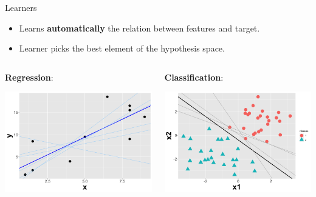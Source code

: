 \documentclass[11pt,compress,t,notes=noshow, xcolor=table]{beamer}
\begin{document}
\begin{vbframe}{Learners}

\begin{itemize}

\item Learns \textbf{automatically} the relation between features and target.
\item Learner picks the best element of the hypothesis space.
\end{itemize} \hspace{0.4cm}

\begin{columns}    
\begin{column}{0.4\textwidth} 
\textbf{Regression}: 

  \begin{center}
    \includegraphics[width=\textwidth]{slides/ml-basics/figure_man/nutshell-ml-basics-hypothesisspace-regr.png} 
  \end{center}
\end{column}    

\begin{column}{0.4\textwidth} 
\textbf{Classification}:
  
  \begin{center}
    \includegraphics[width=\textwidth]{slides/ml-basics/figure_man/nutshell-ml-basics-hypothesisspace-classif.png} 
  \end{center}
\end{column}    
\end{columns}  


\end{vbframe}
\end{document}
